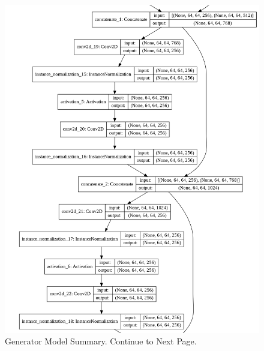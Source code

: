 \begin{figure}[H]
        \vspace*{3cm}
	    \begin{center} 
	    \includegraphics[scale=0.40]{images/Appendix/generator_3.png}
	    \caption{Generator Model Summary. Continue to Next Page.}
	    \end{center}
\end{figure}

